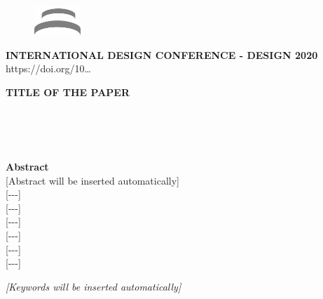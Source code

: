 {
    \titlefont
    \small
    \begin{figure}
        \raggedleft
        \vspace{-0.2cm}
        \includegraphics[width=1.8cm]{design-logo.png}
    \end{figure}
    \noindent \textbf{INTERNATIONAL DESIGN CONFERENCE - DESIGN 2020}\\
    https://doi.org/10\ldots{}
    
    \vspace{2cm}
    
    \Large \noindent \textbf{TITLE OF THE PAPER}
    
    \vspace{1cm}
    
    \normalsize {}\\[0.2cm]
    \footnotesize {}\\[0.1cm]
    \footnotesize {}\\
    
    \begin{mdframed}[backgroundcolor=gray!20] 
        \normalsize \noindent \textbf{Abstract} \\
        \normalfont \small [Abstract will be inserted automatically] \\
        \normalfont \small [-\phantom{}-\phantom{}-] \\
        \normalfont \small [-\phantom{}-\phantom{}-] \\
        \normalfont \small [-\phantom{}-\phantom{}-] \\
        \normalfont \small [-\phantom{}-\phantom{}-] \\
        \normalfont \small [-\phantom{}-\phantom{}-] \\
        \normalfont \small [-\phantom{}-\phantom{}-]
    \end{mdframed}
    
    \small \noindent \textit{[Keywords will be inserted automatically]}
    
    \vspace{0.5cm}
}